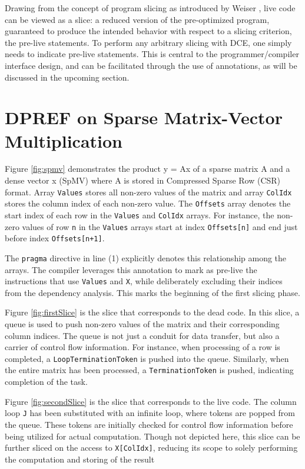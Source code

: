 \documentclass{acaces}
\begin{document}
Drawing from the concept of program slicing as introduced by Weiser \cite{Weiser1984}, live code can be viewed as a slice:
a reduced version of the pre-optimized program, guaranteed to produce the intended behavior with respect to a slicing criterion, the pre-live statements.
To perform any arbitrary slicing with DCE, one simply needs to indicate pre-live statements.
This is central to the programmer/compiler interface design,
and can be facilitated through the use of annotations,
as will be discussed in the upcoming section.

\section{DPREF on Sparse Matrix-Vector Multiplication}

Figure \ref{fig:spmv} demonstrates the product y = Ax of a sparse matrix A and a dense vector x (SpMV) where A is stored in Compressed Sparse Row (CSR) format.
Array \texttt{Values} stores all non-zero values of the matrix and array \texttt{ColIdx} stores the column index of each non-zero value.
The \texttt{Offsets} array denotes the start index of each row in the \texttt{Values} and \texttt{ColIdx} arrays.
For instance, the non-zero values of row \texttt{n} in the \texttt{Values} arrays start at index \texttt{Offsets[n]}
and end just before index \texttt{Offsets[n+1]}.

The \texttt{pragma} directive in line (1) explicitly denotes this relationship among the arrays.
The compiler leverages this annotation to mark as pre-live the instructions that use \texttt{Values} and \texttt{X},
while deliberately excluding their indices from the dependency analysis.
This marks the beginning of the first slicing phase.

Figure \ref{fig:firstSlice} is the slice that corresponds to the dead code.
In this slice, a queue is used to push non-zero values of the matrix and their corresponding column indices.
The queue is not just a conduit for data transfer, but also a carrier of control flow information.
For instance, when processing of a row is completed, a \texttt{LoopTerminationToken} is pushed into the queue.
Similarly, when the entire matrix has been processed, a \texttt{TerminationToken} is pushed, indicating completion of the task.

Figure \ref{fig:secondSlice} is the slice that corresponds to the live code.
The column loop \texttt{J} has been substituted with an infinite loop,
where tokens are popped from the queue.
These tokens are initially checked for control flow information before being utilized for actual computation.
Though not depicted here, this slice can be further sliced on the access to \texttt{X[ColIdx]},
reducing its scope to solely performing the computation and storing of the result
\end{document}
